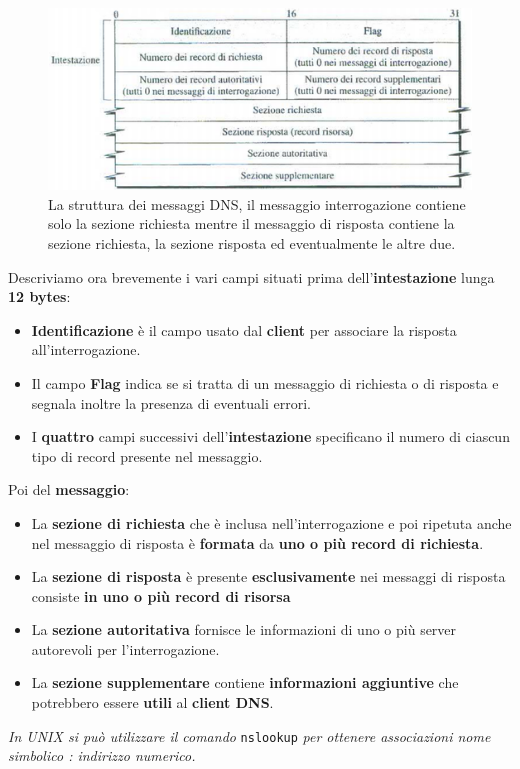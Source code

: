 \documentclass[11pt,a4paper]{article}
\theoremstyle{definition}
\begin{document}
\begin{figure}[!h]
	\includegraphics[scale=0.6]{Immagini/DNSmessage.png}
	\centering
	\caption{La struttura dei messaggi DNS, il messaggio interrogazione contiene solo la sezione richiesta mentre il messaggio di risposta contiene la sezione richiesta, la sezione risposta ed eventualmente le altre due.}
\end{figure}\newline
Descriviamo ora brevemente i vari campi situati prima dell'\textbf{intestazione} lunga \textbf{12 bytes}:
\begin{itemize}
	\item \textbf{Identificazione} è il campo usato dal \textbf{client} per associare la risposta all'interrogazione.
	\item Il campo \textbf{Flag} indica se si tratta di un messaggio di richiesta o di risposta e segnala inoltre la presenza di eventuali errori.
	\item I \textbf{quattro} campi successivi dell'\textbf{intestazione} specificano il numero di ciascun tipo di record presente nel messaggio.
\end{itemize}
Poi del \textbf{messaggio}:
\begin{itemize}
	\item La \textbf{sezione di richiesta} che è inclusa nell'interrogazione e poi ripetuta anche nel messaggio di risposta è \textbf{formata} da\textbf{ uno o più record di richiesta}.
	\item La \textbf{sezione di risposta} è presente \textbf{esclusivamente} nei messaggi di risposta consiste \textbf{in uno o più record di risorsa}
	\item La \textbf{sezione autoritativa} fornisce le informazioni di uno o più server autorevoli per l'interrogazione.
	\item La \textbf{sezione supplementare} contiene \textbf{informazioni aggiuntive} che potrebbero essere \textbf{utili} al \textbf{client DNS}.
\end{itemize}
\textit{In UNIX si può utilizzare il comando} \texttt{nslookup} \textit{per ottenere associazioni nome simbolico : indirizzo numerico.}
\newpage
\end{document}
